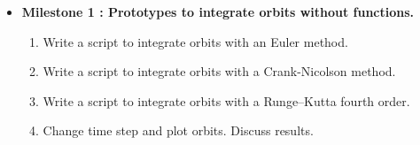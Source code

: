 \documentclass[12pt, a4paper]{article}
\begin{document}
\begin{itemize}
	
	
\vspace{1cm}
%
%
%
%
% 
%
%
%
%
%
%
%
%
%
%  
% 
%
%

\item {\bf Milestone 1 : 
Prototypes to integrate orbits without functions.
  } 

\begin{enumerate} 
\item Write a script to integrate  orbits with an Euler method. 
\item Write a script to integrate  orbits with a Crank-Nicolson method. 
\item Write a script to integrate  orbits with a Runge--Kutta fourth order.
\item Change time step and plot orbits. Discuss results. 
 \end{enumerate} 




\end{itemize}
\end{document}
